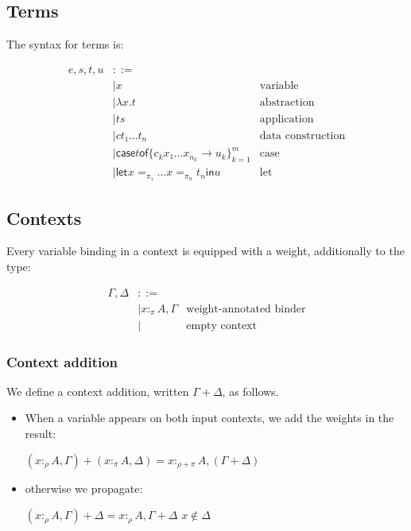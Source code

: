 \documentclass[11pt]{article}
\newcommand{\case}[2]{\mathsf{case} #1 \mathsf{of} \{#2\}^m_{k=1}}
\newcommand{\flet}[1][]{\mathsf{let}_{#1} }
\newcommand{\fin}{ \mathsf{in} }
\begin{document}
\subsection{Terms}
\label{sec:orgheadline3}

The syntax for terms is:

\begin{align*}
e,s,t,u & ::= \\
    & |  x & \text{variable} \\
    & |  λx. t & \text{abstraction} \\
    & |  t s & \text{application} \\
    & |  c t₁ … t_n & \text{data construction} \\
    & |  \case t {c_k  x₁ … x_{n_k} → u_k}  & \text{case} \\
    & |  \flet x =_{π₁} … x =_{π_n} t_n \fin u & \text{let}
\end{align*}

\subsection{Contexts}
\label{sec:orgheadline6}

Every variable binding in a context is equipped with a weight,
additionally to the type:

\begin{align*}
  Γ,Δ & ::=\\
    & |  x :_π A, Γ & \text{weight-annotated binder} \\
    & |     & \text {empty context}
\end{align*}

\subsubsection{Context addition}
\label{sec:orgheadline4}

We define a context addition, written \(Γ+Δ\), as follows.

\begin{itemize}
\item When a variable appears on both input contexts, we add the weights in
the result:

\((x :_ρ A,Γ) + (x :_π A,Δ) = x :_{ρ+π} A, (Γ+Δ)\)

\item otherwise we propagate:

\((x :_ρ A,Γ) + Δ = x :_ρ A, Γ+Δ\)   \hfill   \(x ∉ Δ\)
\end{itemize}
\end{document}
